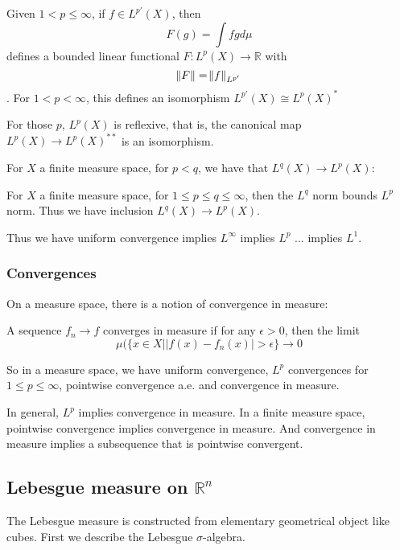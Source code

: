 \documentclass[main.tex]{subfiles}
\begin{document}
\begin{theorem}
Given $1 < p \leq \infty$, if $f \in L^{p'}(X)$, then 
$$
F(g) = \int fg d\mu 
$$
defines a bounded linear functional $F: L^p(X) \rightarrow \mathbb{R}$ with 
$$
\norm{F} = \norm{f}_{L^{p'}}
$$.
For $1 < p < \infty$, this defines an isomorphism $L^{p'}(X) \cong L^p(X)^*$
\end{theorem}

\begin{corollary}
For those $p$, $L^p(X)$ is reflexive, that is, the canonical map $L^p(X) \rightarrow L^p(X)^{**}$ is an isomorphism.
\end{corollary}

For $X$ a finite measure space, for $p < q$, we have that $L^q(X) \xrightarrow{} L^p(X)$:

\begin{theorem}
For $X$ a finite measure space, for $1 \leq p \leq q \leq \infty$, then the $L^q$ norm bounds $L^p$ norm. Thus we have inclusion $L^q(X) \xrightarrow{} L^p(X)$. 
\end{theorem}

Thus we have uniform convergence implies $L^\infty$ implies $L^p$ ... implies $L^1$.

\subsubsection{Convergences}
On a measure space, there is a notion of convergence in measure:

\begin{definition}
A sequence $f_n \rightarrow f$ converges in measure if for any $\epsilon > 0$, then the limit 
$$
\mu(\{x \in X | |f(x) - f_n(x)| > \epsilon\} \rightarrow 0
$$

\end{definition}
So in a measure space, we have uniform convergence, $L^p$ convergences for $1 \leq p \leq \infty$, pointwise convergence a.e. and convergence in measure.

In general, $L^p$ implies convergence in measure. In a finite measure space, pointwise convergence implies convergence in measure. And convergence in measure implies a subsequence that is pointwise convergent.
\subsection{Lebesgue measure on $\mathbb{R}^n$}

The Lebesgue measure is constructed from elementary geometrical object like cubes. First we describe the Lebesgue $\sigma$-algebra.
\end{document}
